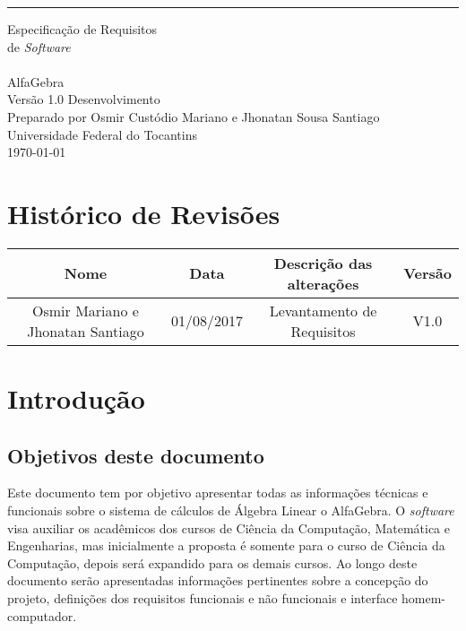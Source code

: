 \documentclass{scrreprt}
\date{}
\def\myversion{1.0 }
\begin{document}
\begin{flushright}
    \rule{16cm}{5pt}\vskip1cm
    \begin{bfseries}
        \Huge{Especificação de Requisitos\\ de \textit{Software}}\\ 
        \vspace{1.9cm}
        \\
        \vspace{1.9cm}
        AlfaGebra\\
        \vspace{1.9cm}
        \LARGE{Versão \myversion Desenvolvimento}\\
        \vspace{1.9cm}
        Preparado por Osmir Custódio Mariano e Jhonatan Sousa Santiago\\
        \vspace{1.9cm}
        Universidade Federal do Tocantins\\
        \vspace{1.9cm}
        \today\\
    \end{bfseries}
\end{flushright}

\tableofcontents


\chapter*{Histórico de Revisões}

\begin{center}
    \begin{tabular}{|c|c|c|c|}
        \hline
	    Nome & Data & Descrição das alterações & Versão\\
        \hline
	    Osmir Mariano e Jhonatan Santiago & 01/08/2017 & Levantamento de Requisitos & V1.0\\
        \hline
    \end{tabular}
\end{center}

\chapter*{Introdução}

\section{Objetivos deste documento}
Este documento tem por objetivo apresentar todas as informações técnicas e funcionais sobre o sistema de cálculos de Álgebra Linear o AlfaGebra. O \textit{software} visa auxiliar os acadêmicos dos cursos de Ciência da Computação, Matemática e Engenharias, mas inicialmente a proposta é somente para o curso de Ciência da Computação, depois será expandido para os demais cursos. Ao longo deste documento serão apresentadas informações pertinentes sobre a concepção do projeto, definições dos requisitos funcionais e não funcionais e interface homem-computador.
\end{document}
